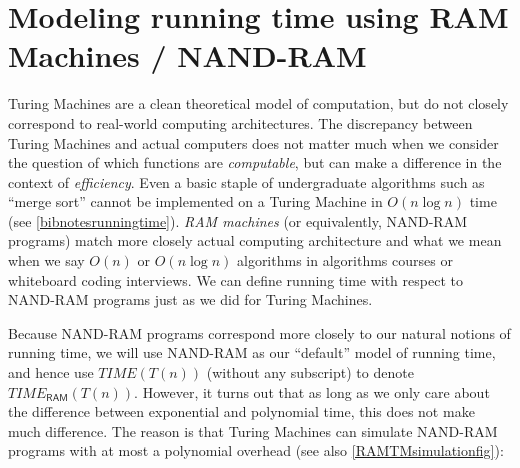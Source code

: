 \section{Modeling running time using RAM Machines /
NAND-RAM}\label{Modeling-running-time-usi}

Turing Machines are a clean theoretical model of computation, but do not
closely correspond to real-world computing architectures. The
discrepancy between Turing Machines and actual computers does not matter
much when we consider the question of which functions are
\emph{computable}, but can make a difference in the context of
\emph{efficiency}. Even a basic staple of undergraduate algorithms such
as ``merge sort'' cannot be implemented on a Turing Machine in
\(O(n\log n)\) time (see \cref{bibnotesrunningtime}). \emph{RAM
machines} (or equivalently, NAND-RAM programs) match more closely actual
computing architecture and what we mean when we say \(O(n)\) or
\(O(n \log n)\) algorithms in algorithms courses or whiteboard coding
interviews. We can define running time with respect to NAND-RAM programs
just as we did for Turing Machines.

\hypertarget{time-def}{}

Because NAND-RAM programs correspond more closely to our natural notions
of running time, we will use NAND-RAM as our ``default'' model of
running time, and hence use \(\ensuremath{\mathit{TIME}}(T(n))\)
(without any subscript) to denote
\(\ensuremath{\mathit{TIME}}_{\mathsf{RAM}}(T(n))\). However, it turns
out that as long as we only care about the difference between
exponential and polynomial time, this does not make much difference. The
reason is that Turing Machines can simulate NAND-RAM programs with at
most a polynomial overhead (see also \cref{RAMTMsimulationfig}):

